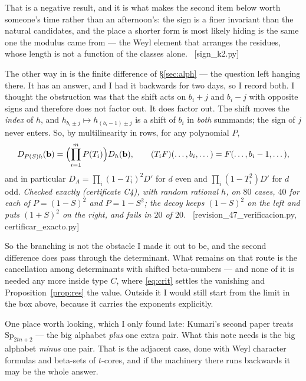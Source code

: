 \documentclass[11pt,a4paper]{article}
\theoremstyle{definition}
\newcommand{\Sp}{\mathrm{Sp}}
\newcommand{\ver}[1]{\unskip\penalty0\ \textcolor{azul}{\small\textsf{[#1]}}}
\begin{document}
\noindent That is a negative result, and it is what makes the second item below worth someone's time
rather than an afternoon's: the sign is a finer invariant than the natural candidates, and the
place a shorter form is most likely hiding is the same one the modulus came from --- the Weyl
element that arranges the residues, whose length is not a function of the classes alone.
\ver{sign\_k2.py}

\noindent The other way in is the finite difference of \S\ref{sec:alph} --- the question left
hanging there. It has an answer, and I had it backwards for two days, so I record both. I thought
the obstruction was that the shift acts on $b_i+j$ and $b_i-j$ with opposite signs and therefore does
not factor out. It does factor out. The shift moves the \emph{index} of $h$, and $h_{b_i\pm
j}\mapsto h_{(b_i-1)\pm j}$ is a shift of $b_i$ in \emph{both} summands; the sign of $j$ never
enters. So, by multilinearity in rows, for any polynomial $P$,
\[
D_{P(S)h}(\mathbf b)=\Bigl(\prod_{i=1}^{m}P(T_i)\Bigr)D_h(\mathbf b),
\qquad (T_iF)(\dots,b_i,\dots)=F(\dots,b_i-1,\dots),
\]
and in particular $D_A=\prod_i(1-T_i)^2 D'$ for $d$ even and $\prod_i(1-T_i^2)D'$ for $d$ odd.
\emph{Checked exactly (certificate C4), with random rational $h$, on $80$ cases, $40$ for each of
$P=(1-S)^2$ and $P=1-S^2$; the decoy keeps $(1-S)^2$ on the left and puts $(1+S)^2$ on the right,
and fails in $20$ of $20$.}
\ver{revision\_47\_verificacion.py, certificar\_exacto.py}

So the branching is not the obstacle I made it out to be, and the second difference does
pass through the determinant. What remains on that route is the cancellation among determinants with
shifted beta-numbers --- and none of it is needed any more inside type $C$, where \eqref{eq:crit}
settles the vanishing and Proposition~\ref{prop:res} the value. Outside it I would still start from
the limit in the box above, because it carries the exponents explicitly.

One place worth looking, which I only found late: Kumari's second paper \cite{Kum24}
treats $\Sp_{2tn+2}$ --- the big alphabet \emph{plus} one extra pair. What this note needs is the big
alphabet \emph{minus} one pair. That is the adjacent case, done with Weyl character formulas and
beta-sets of $t$-cores, and if the machinery there runs backwards it may be the whole answer.
\end{document}
